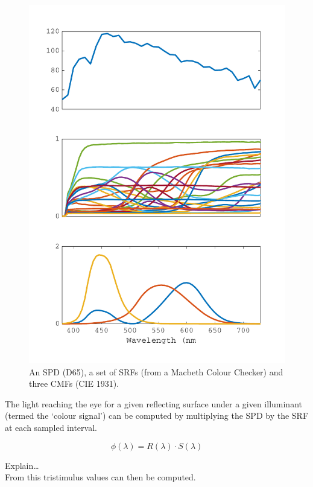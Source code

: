 \begin{figure}[htbp]
\includegraphics[max width=\textwidth]{figs/LitRev/SPDetc.pdf}
\caption{An \gls{SPD} (D65), a set of \glspl{SRF} (from a Macbeth Colour Checker) and three \glspl{CMF} (CIE 1931).}
\label{fig:specFun}
\end{figure}

The light reaching the eye for a given reflecting surface under a given illuminant (termed the `colour signal') can be computed by multiplying the \gls{SPD} by the \gls{SRF} at each sampled interval.

\begin{equation}
\phi(\lambda)=R(\lambda) \cdot S(\lambda)
\end{equation}

Explain\dots \\
From this tristimulus values can then be computed.

